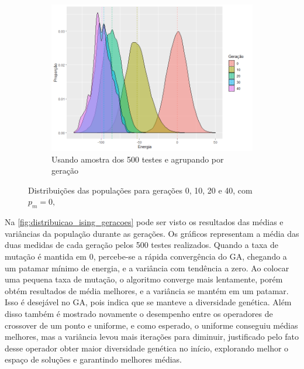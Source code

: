 \begin{figure}[ht]
\begin{subfigure}[b]{0.67\linewidth}
		\includegraphics[width=\linewidth]{imagens/Distribuicao_amostral_500_testes_sem_mut.png}
		\caption{Usando amostra dos 500 testes e agrupando por geração}
	\end{subfigure}
\caption{Distribuições das populações para gerações 0, 10, 20 e 40, com \(p_m=0,\)}
	\label{fig:distribuicao_ising_2}
\end{figure}

Na \autoref{fig:distribuicao_ising_geracoes} pode ser visto os resultados das médias e variâncias da população durante as gerações. Os gráficos representam a média das duas medidas de cada geração pelos 500 testes realizados. Quando a taxa de mutação é mantida em 0, percebe-se a rápida convergência do GA, chegando a um patamar mínimo de energia, e a variância com tendência a zero. Ao colocar uma pequena taxa de mutação, o algoritmo converge mais lentamente, porém obtém resultados de média melhores, e a variância se mantém em um patamar. Isso é desejável no GA, pois indica que se manteve a diversidade genética. Além disso também é mostrado novamente o desempenho entre os operadores de crossover de um ponto e uniforme, e como esperado, o uniforme conseguiu médias melhores, mas a variância levou mais iterações para diminuir, justificado pelo fato desse operador obter maior diversidade genética no início, explorando melhor o espaço de soluções e garantindo melhores médias.

